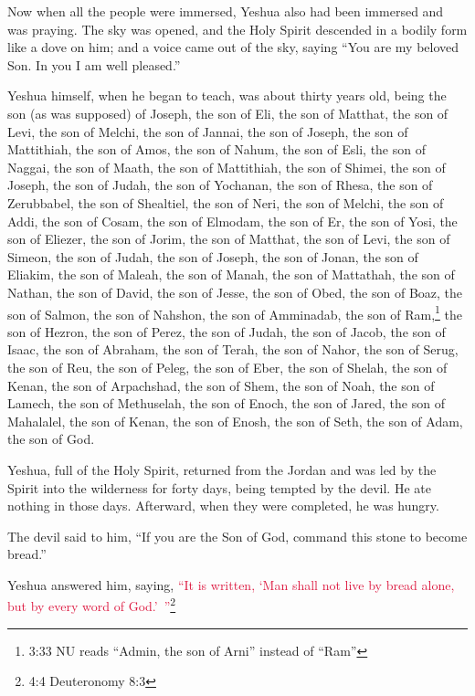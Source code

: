 \myverse{}Now when all the people were immersed, Yeshua also had been immersed
and was praying. The sky was opened,
\myverse{}and the Holy Spirit descended in a bodily form like a dove on him; and a voice
came out of the sky, saying “You are my beloved Son. In you I am well pleased.”

\myverse{}Yeshua himself, when he began to teach, was about thirty years
old, being the son (as was supposed) of Joseph, the son of Eli,
\myverse{}the son of Matthat, the son of Levi, the son of Melchi, the son of Jannai,
the son of Joseph,
\myverse{}the son of Mattithiah, the son of Amos, the son of Nahum, the son of Esli,
the son of Naggai,
\myverse{}the son of Maath, the son of Mattithiah, the son of Shimei, the son of Joseph,
the son of Judah,
\myverse{}the son of Yochanan, the son of Rhesa, the son of Zerubbabel, the son of Shealtiel,
the son of Neri,
\myverse{}the son of Melchi, the son of Addi, the son of Cosam, the son of Elmodam,
the son of Er,
\myverse{}the son of Yosi, the son of Eliezer, the son of Jorim, the son of Matthat,
the son of Levi,
\myverse{}the son of Simeon, the son of Judah, the son of Joseph, the son of Jonan,
the son of Eliakim,
\myverse{}the son of Maleah, the son of Manah, the son of Mattathah, the son of Nathan,
the son of David,
\myverse{}the son of Jesse, the son of Obed, the son of Boaz, the son of Salmon, the
son of Nahshon,
\myverse{}the son of Amminadab, the son of Ram,\footnote{3:33 NU reads “Admin, the son of Arni” instead of “Ram”} the son of Hezron, the son of Perez,
the son of Judah,
\myverse{}the son of Jacob, the son of Isaac, the son of Abraham, the son of Terah,
the son of Nahor,
\myverse{}the son of Serug, the son of Reu, the son of Peleg, the son of Eber, the son
of Shelah,
\myverse{}the son of Kenan, the son of Arpachshad, the son of Shem, the son of Noah,
the son of Lamech,
\myverse{}the son of Methuselah, the son of Enoch, the son of Jared, the son of Mahalalel,
the son of Kenan,
\myverse{}the son of Enosh, the son of Seth, the son of Adam, the son of God.


\mychapter{} \myverse*{}Yeshua, full of the Holy Spirit, returned from the Jordan and was
led by the Spirit into the wilderness
\myverse{}for forty days, being tempted by the devil. He ate nothing in those days. Afterward,
when they were completed, he was hungry.

\myverse{}The devil said to him, “If you are the Son of God, command this
stone to become bread.”

\myverse{}Yeshua answered him, saying,
\textcolor{crimson}{“It is written, ‘Man shall not live by bread alone, but by every word of God.’ ”}\footnote{ 4:4 Deuteronomy 8:3}


